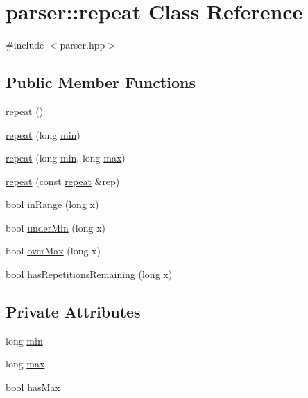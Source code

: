 \hypertarget{classparser_1_1repeat}{}\section{parser\+:\+:repeat Class Reference}
\label{classparser_1_1repeat}


{\ttfamily \#include $<$parser.\+hpp$>$}

\subsection*{Public Member Functions}
\begin{DoxyCompactItemize}
\item 
\hyperlink{classparser_1_1repeat_a5f4b0f9282d8683b57d999d9c9596155}{repeat} ()
\item 
\hyperlink{classparser_1_1repeat_a95498b83f117d845cb1a91aa22ff2067}{repeat} (long \hyperlink{classparser_1_1repeat_a4a52b46d6d8139c877b78454942c03fd}{min})
\item 
\hyperlink{classparser_1_1repeat_a08e03f68f22e34134d347a62f2a62373}{repeat} (long \hyperlink{classparser_1_1repeat_a4a52b46d6d8139c877b78454942c03fd}{min}, long \hyperlink{classparser_1_1repeat_a5d423398c46938e601f07ae95f119ea7}{max})
\item 
\hyperlink{classparser_1_1repeat_ac1320ff0936d3e4e14c9e67cdd6dc481}{repeat} (const \hyperlink{classparser_1_1repeat}{repeat} \&rep)
\item 
bool \hyperlink{classparser_1_1repeat_a5034ec8bb7dd25a9c6f53a62875aace3}{in\+Range} (long x)
\item 
bool \hyperlink{classparser_1_1repeat_a67c60e501c7e0fa33f2f3f1b99e44b62}{under\+Min} (long x)
\item 
bool \hyperlink{classparser_1_1repeat_ab52008340dc919bf7b81c50ba36f55e7}{over\+Max} (long x)
\item 
bool \hyperlink{classparser_1_1repeat_a20153be6931a239d9aa32cf0adb948ac}{has\+Repetitions\+Remaining} (long x)
\end{DoxyCompactItemize}
\subsection*{Private Attributes}
\begin{DoxyCompactItemize}
\item 
long \hyperlink{classparser_1_1repeat_a4a52b46d6d8139c877b78454942c03fd}{min}
\item 
long \hyperlink{classparser_1_1repeat_a5d423398c46938e601f07ae95f119ea7}{max}
\item 
bool \hyperlink{classparser_1_1repeat_a997f9a57da38d6d3893212cf7129603e}{has\+Max}
\end{DoxyCompactItemize}


